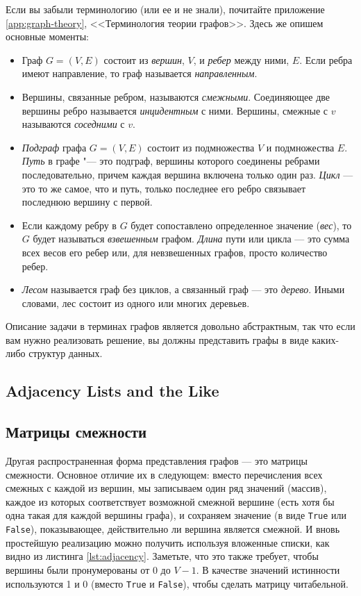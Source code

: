 Если вы забыли терминологию (или ее и не знали), почитайте приложение \ref{app:graph-theory}, <<Терминология теории графов>>. Здесь же опишем основные моменты:

\begin{itemize}
\item Граф $G = (V, E)$ состоит из \textit{вершин}, $V$, и \textit{ребер} между ними, $E$. Если ребра имеют направление, то граф называется \textit{направленным}.
\item Вершины, связанные ребром, называются \textit{смежными}. Соединяющее две вершины ребро называется \textit{инцидентным} с ними. Вершины, смежные с $v$ называются \textit{соседними} с $v$.
\item \textit{Подграф} графа $G = (V,E)$ состоит из подмножества $V$ и подмножества $E$. \textit{Путь} в графе "--- это подграф, вершины которого соединены ребрами последовательно, причем каждая вершина включена только один раз. \textit{Цикл} — это то же самое, что и путь, только последнее его ребро связывает последнюю вершину с первой.
\item Если каждому ребру в $G$ будет сопоставлено определенное значение (\textit{вес}), то $G$ будет называться \textit{взвешенным} графом. \textit{Длина} пути или цикла — это сумма всех весов его ребер или, для невзвешенных графов, просто количество ребер.
\item \textit{Лесом} называется граф без циклов, а связанный граф — это \textit{дерево}. Иными словами, лес состоит из одного или многих деревьев.
\end{itemize}

Описание задачи в терминах графов является довольно абстрактным, так что если вам нужно реализовать решение, вы должны представить графы в виде каких-либо структур данных.

\subsection{Adjacency Lists and the Like}
\subsection{Матрицы смежности}
\label{sec:adjacency-matrix}

Другая распространенная форма представления графов — это матрицы смежности. Основное отличие их в следующем: вместо перечисления всех смежных с каждой из вершин, мы записываем один ряд значений (массив), каждое из которых соответствует возможной смежной вершине (есть хотя бы одна такая для каждой вершины графа), и сохраняем значение (в виде \texttt{True} или \texttt{False}), показывающее, действительно ли вершина является смежной. И вновь простейшую реализацию можно получить используя вложенные списки, как видно из листинга \ref{lst:adjacency}. Заметьте, что это также требует, чтобы вершины были пронумерованы от $0$ до $V-1$. В качестве значений истинности используются 1 и 0 (вместо \texttt{True} и \texttt{False}), чтобы сделать матрицу читабельной.

